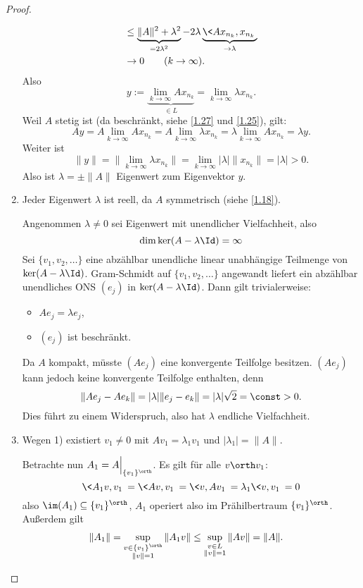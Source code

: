 \begin{st}
\begin{proof}
\begin{enumerate}[1)]
\begin{align*}
					&\le \underbrace{\|A\|^2 + \lambda^2}_{=2\lambda^2} - 2 \lambda \underbrace{\<Ax_{n_k}, x_{n_k}\>}_{\to \lambda} \\
					& \to 0 \qquad (k\to \infty).
				\end{align*}
				Also
				\[
					y := \underbrace{\lim_{k\to \infty} Ax_{n_k}}_{\in L} = \lim_{k\to \infty} \lambda x_{n_k}.
				\]
				Weil $A$ stetig ist (da beschränkt, siehe \ref{1.27} und \ref{1.25}), gilt:
				\[
					Ay
					= A \lim_{k\to\infty} A x_{n_k}
					= A \lim_{k\to\infty} \lambda x_{n_k}
					= \lambda \lim_{k\to\infty} Ax_{n_k}
					= \lambda y.
				\]
				Weiter ist
				\[
					\|y\|
					= \Big\|\lim_{k\to\infty} \lambda x_{n_k}\Big\|
					= \lim_{k\to\infty} |\lambda| \|x_{n_k}\|
					= |\lambda|
					> 0.
				\]
				Also ist $\lambda = \pm \|A\|$ Eigenwert zum Eigenvektor $y$.
			\item
{}
				Jeder Eigenwert $\lambda$ ist reell, da $A$ symmetrisch (siehe \ref{1.18}).

				Angenommen $\lambda \neq 0$ sei Eigenwert mit unendlicher Vielfachheit, also
				\[
					\dim \ker (A - \lambda \Id) = \infty
				\]
				Sei $\{v_1,v_2,\dotsc\}$ eine abzählbar unendliche linear unabhängige Teilmenge von $\ker(A-\lambda \Id)$.
				Gram-Schmidt auf $\{v_1,v_2,\dotsc\}$ angewandt liefert ein abzählbar unendliches ONS $(e_j)$ in $\ker (A-\lambda \Id)$.
				Dann gilt trivialerweise:
				\begin{itemize}
					\item
						$Ae_j = \lambda e_j$,
					\item
						$(e_j)$ ist beschränkt.
				\end{itemize}
				Da $A$ kompakt, müsste $(Ae_j)$ eine konvergente Teilfolge besitzen.
				$(Ae_j)$ kann jedoch keine konvergente Teilfolge enthalten, denn
				\[
					\|Ae_j - Ae_k\| = |\lambda| \|e_j-e_k\| = |\lambda| \sqrt 2 = \const > 0.
				\]
				Dies führt zu einem Widerspruch, also hat $\lambda$ endliche Vielfachheit.
			\item
				Wegen 1) existiert $v_1 \neq 0$ mit $Av_1 = \lambda_1v_1$ und $|\lambda_1| = \|A\|$.

				Betrachte nun $A_1 = A \Big|_{\{v_1\}^\orth}$.
				Es gilt für alle $v \orth v_1$:
				\[
					\<A_1v,v_1\> = \<Av,v_1\> = \<v,Av_1\> = \lambda_1\<v,v_1\> = 0
				\]
				also $\im (A_1) \subset \{v_1\}^\orth$, $A_1$ operiert also im Prähilbertraum $\{v_1\}^\orth$.
				Außerdem gilt
				\begin{align*}
					\|A_1\|
					&= \sup_{\substack{v\in \{v_1\}^\orth \\ \|v\|=1}} \|A_1 v\|
					\le \sup_{\substack{v\in L \\ \|v\|=1}} \|A v\|
					= \|A\|.
				\end{align*}


\end{enumerate}
\end{proof}
\end{st}
